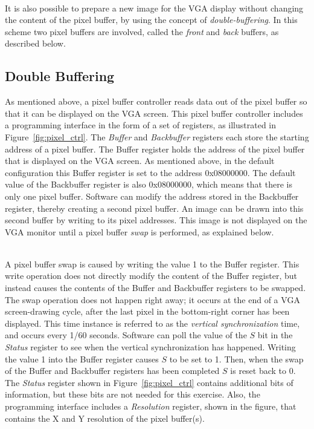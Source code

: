 \documentclass[epsfig,10pt,fullpage]{article}
\begin{document}
~\\
It is also possible to prepare a new image for the VGA display without changing the content 
of the pixel buffer, by using the concept of {\it double-buffering}.  In this scheme two 
pixel buffers are involved, called the {\it front} and {\it back} buffers, as described below.

\subsection*{Double Buffering}
\label{sec:double_buffer}
As mentioned above, a pixel buffer controller reads data out of the pixel buffer so that it 
can be displayed on the VGA screen. This pixel buffer controller 
includes a programming interface in the form of a set of registers, as
illustrated in Figure~\ref{fig:pixel_ctrl}.
The {\it Buffer} and {\it Backbuffer} registers each store the starting address of a pixel buffer.
The Buffer register holds the address of the pixel buffer that is displayed on the VGA screen.
As mentioned above, in the default configuration this Buffer register is set to the address {\sf 0x08000000}.
The default value of the Backbuffer register is also {\sf 0x08000000}, which means that there is only one pixel buffer.
Software can modify the address stored in the Backbuffer register, thereby creating a second pixel buffer.
An image can be drawn into this second buffer by writing to its pixel addresses.
This image is not displayed on the VGA monitor until a pixel buffer {\it swap} is performed, as explained below.

~\\
A pixel buffer swap is caused by writing the value 1 to the Buffer register. This write
operation does not directly modify the content of the Buffer register, but instead causes
the contents of the Buffer and Backbuffer registers to be swapped. The swap operation does
not happen right away; it occurs at the end of a VGA screen-drawing cycle, after the last 
pixel in the bottom-right corner has been displayed. This time instance is referred to as
the {\it vertical synchronization} time, and occurs every 1/60 seconds. Software can poll the
value of the $S$ bit in the {\it Status} register to see when the vertical synchronization has happened.
Writing the value 1 into the Buffer register causes $S$ to be set to 1. Then, when the swap of
the Buffer and Backbuffer registers has been completed $S$ is reset back to 0. The {\it Status}
register shown in Figure~\ref{fig:pixel_ctrl} contains additional bits of information,
but these bits are not needed for this exercise.  Also, the programming interface includes
a {\it Resolution} register, shown in the figure, that contains the X and Y resolution of the pixel buffer(s).  
\end{document}
